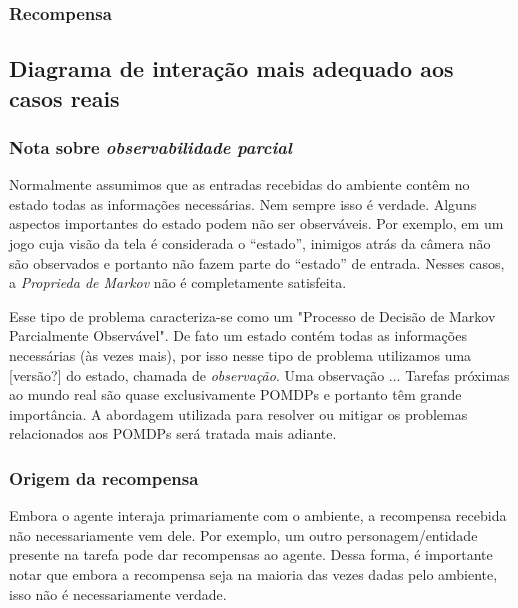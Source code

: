 \documentclass{article}
\begin{document}
            \subsubsection{Recompensa}
        
                
        \subsection{Diagrama de interação mais adequado aos casos reais}
        
            \subsubsection{Nota sobre \emph{observabilidade parcial}}

                Normalmente assumimos que as entradas recebidas do ambiente contêm no estado todas as informações necessárias. Nem sempre isso é verdade. Alguns aspectos importantes do estado podem não ser observáveis. Por exemplo, em um jogo cuja visão da tela é considerada o ``estado'', inimigos atrás da câmera não são observados e portanto não fazem parte do ``estado'' de entrada. Nesses casos, a \emph{Proprieda de Markov} não é completamente satisfeita. 
                
                Esse tipo de problema caracteriza-se como um "Processo de Decisão de Markov Parcialmente Observável". De fato um estado contém todas as informações necessárias (às vezes mais), por isso nesse tipo de problema utilizamos uma [versão?] do estado, chamada de \emph{observação}. Uma observação ... Tarefas próximas ao mundo real são quase exclusivamente POMDPs e portanto têm grande importância. A abordagem utilizada para resolver ou mitigar os problemas relacionados aos POMDPs será tratada mais adiante.

            \subsubsection{Origem da recompensa}
            
                Embora o agente interaja primariamente com o ambiente, a recompensa recebida não necessariamente vem dele. Por exemplo, um outro personagem/entidade presente na tarefa pode dar recompensas ao agente. Dessa forma, é importante notar que embora a recompensa seja na maioria das vezes dadas pelo ambiente, isso não é necessariamente verdade.
\end{document}
